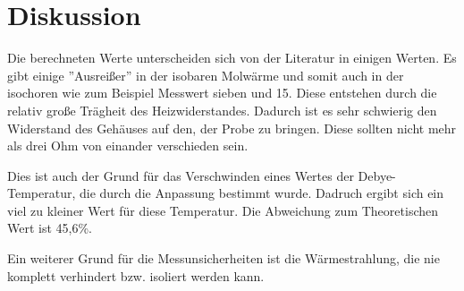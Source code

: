 \section{Diskussion}
Die berechneten Werte unterscheiden sich von der Literatur in einigen Werten. Es gibt einige ''Ausreißer'' in der isobaren Molwärme und somit auch in der isochoren wie zum Beispiel Messwert sieben und 15. Diese entstehen durch die relativ große Trägheit des Heizwiderstandes. Dadurch ist es sehr schwierig den Widerstand des Gehäuses auf den, der Probe zu bringen. Diese sollten nicht mehr als drei Ohm von einander verschieden sein.

\noindent Dies ist auch der Grund für das Verschwinden eines Wertes der Debye-Temperatur, die durch die Anpassung bestimmt wurde. Dadruch ergibt sich ein viel zu kleiner Wert für diese Temperatur. Die Abweichung zum Theoretischen Wert ist 45,6\%.

\noindent Ein weiterer Grund für die Messunsicherheiten ist die Wärmestrahlung, die nie komplett verhindert bzw. isoliert werden kann.